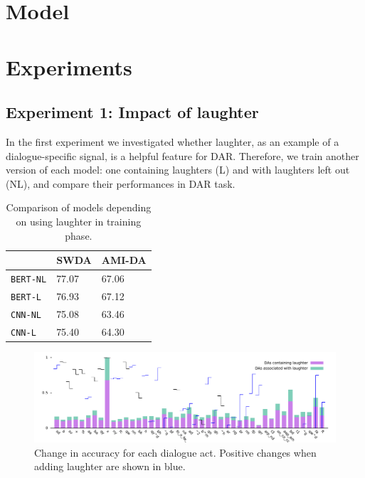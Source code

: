 \documentclass[11pt,a4paper]{article}
\begin{document}
  
\section{Model} %

\section{Experiments}
\subsection{Experiment 1: Impact of laughter}   %
In the first experiment we investigated whether laughter, as an example of a dialogue-specific signal, is a helpful feature for DAR.
Therefore, we train another version of each model: one containing laughters (L) and with laughters left out (NL), and compare their performances in DAR task.

\begin{table}
  \centering
  \begin{tabular}{@{}lll@{}}
    \toprule
                      & SWDA  & AMI-DA \\ \midrule
    \texttt{BERT-NL}  & 77.07 & 67.06       \\ 
    \texttt{BERT-L}   & 76.93 & 67.12       \\ \midrule
    \texttt{CNN-NL}   & 75.08 & 63.46        \\
    \texttt{CNN-L}    & 75.40 & 64.30        \\ \bottomrule
    
  \end{tabular}
  \caption{Comparison of models depending on using laughter in training phase.}
\end{table}

\begin{figure}
  \centering
  \includegraphics[width=\textwidth]{img/bertLvsNL.pdf}
  \caption{Change in accuracy for each dialogue act. Positive changes when adding laughter are shown in blue. }
\end{figure}
\end{document}

